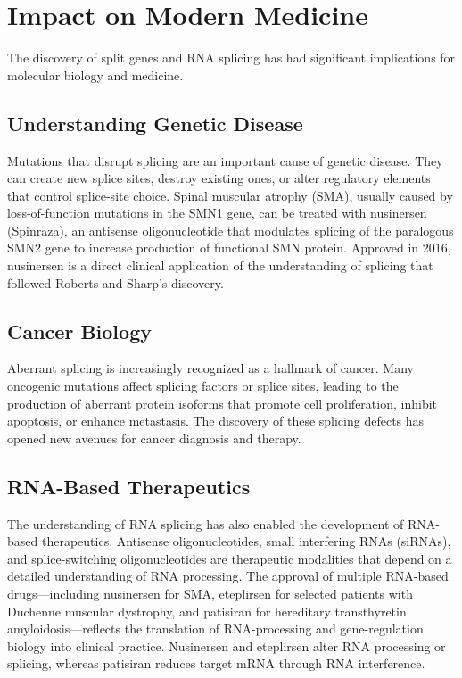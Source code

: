 \section{Impact on Modern Medicine}

The discovery of split genes and RNA splicing has had significant implications for molecular biology and medicine.

\subsection{Understanding Genetic Disease}

Mutations that disrupt splicing are an important cause of genetic disease. They can create new splice sites, destroy existing ones, or alter regulatory elements that control splice-site choice. Spinal muscular atrophy (SMA), usually caused by loss-of-function mutations in the SMN1 gene, can be treated with nusinersen (Spinraza), an antisense oligonucleotide that modulates splicing of the paralogous SMN2 gene to increase production of functional SMN protein. Approved in 2016, nusinersen is a direct clinical application of the understanding of splicing that followed Roberts and Sharp's discovery.

\subsection{Cancer Biology}

Aberrant splicing is increasingly recognized as a hallmark of cancer. Many oncogenic mutations affect splicing factors or splice sites, leading to the production of aberrant protein isoforms that promote cell proliferation, inhibit apoptosis, or enhance metastasis. The discovery of these splicing defects has opened new avenues for cancer diagnosis and therapy.

\subsection{RNA-Based Therapeutics}

The understanding of RNA splicing has also enabled the development of RNA-based therapeutics. Antisense oligonucleotides, small interfering RNAs (siRNAs), and splice-switching oligonucleotides are therapeutic modalities that depend on a detailed understanding of RNA processing. The approval of multiple RNA-based drugs---including nusinersen for SMA, eteplirsen for selected patients with Duchenne muscular dystrophy, and patisiran for hereditary transthyretin amyloidosis---reflects the translation of RNA-processing and gene-regulation biology into clinical practice. Nusinersen and eteplirsen alter RNA processing or splicing, whereas patisiran reduces target mRNA through RNA interference.

